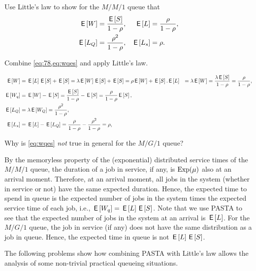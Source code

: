 \begin{exercise}
Use Little's law to show for the $M/M/1$ queue that 
  \begin{align*}
    \,\mathsf{E}\left[W\right] &= \frac{\,\mathsf{E}\left[S\right]}{1-\rho}, & \,\mathsf{E}\left[L\right] &= \frac\rho{1-\rho}, \\
    \,\mathsf{E}\left[L_Q\right] &= \frac{\rho^2}{1-\rho}, & \,\mathsf{E}\left[L_s\right] &= \rho.
  \end{align*}
\begin{hint}
  Combine \cref{eq:78,eq:wqes} and apply Little's law. 
\end{hint}
\begin{solution}
\begin{align*}
  \,\mathsf{E}\left[W\right] &= \,\mathsf{E}\left[L\right] \,\mathsf{E}\left[S\right] + \,\mathsf{E}\left[S\right] = \lambda \,\mathsf{E}\left[W\right] \,\mathsf{E}\left[S\right] + \,\mathsf{E}\left[S\right]= \rho \,\mathsf{E}\left[W\right] + \,\mathsf{E}\left[S\right]. 
    \,\mathsf{E}\left[L\right] &= \lambda \,\mathsf{E}\left[W\right] = \frac{\lambda \,\mathsf{E}\left[S\right]}{1-\rho} = \frac\rho{1-\rho}, \\
    \,\mathsf{E}\left[W_q\right] &= \,\mathsf{E}\left[W\right] - \,\mathsf{E}\left[S\right] = \frac{\,\mathsf{E}\left[S\right]}{1-\rho} - \,\mathsf{E}\left[S\right] = \frac{\rho}{1-\rho} \,\mathsf{E}\left[S\right],\\
  \,\mathsf{E}\left[L_Q\right] &= \lambda \,\mathsf{E}\left[W_Q\right] = \frac{\rho^2}{1-\rho}, \\
  \,\mathsf{E}\left[L_s\right] &= \,\mathsf{E}\left[L\right] - \,\mathsf{E}\left[L_Q\right] = \frac{\rho}{1-\rho} - \frac{\rho^2}{1-\rho} = \rho, 
\end{align*}
\end{solution}
\end{exercise}

\begin{exercise}
Why is \cref{eq:wqes} \emph{not} true in general for the $M/G/1$ queue? 
\begin{solution}
  By the memoryless property of the (exponential) distributed service times of the $M/M/1$ queue, the duration of a job in service, if any, is $\operatorname{Exp}(\mu)$ also at an arrival moment.
  Therefore, at an arrival moment, all jobs in the system (whether in service or not) have the same expected duration.
  Hence, the expected time to spend in queue is the expected number of jobs in the system times the expected service time of each job, i.e., $\,\mathsf{E}\left[W_q\right] = \,\mathsf{E}\left[L\right] \,\mathsf{E}\left[S\right]$.
  Note that we use PASTA to see that the expected number of jobs in the system at an arrival is $\,\mathsf{E}\left[L\right]$.
  For the $M/G/1$ queue, the job in service (if any) does not have the same distribution as a job in queue.
  Hence, the expected time in queue is not $\,\mathsf{E}\left[L\right] \,\mathsf{E}\left[S\right]$.
  \end{solution}
\end{exercise}


The following problems show how combining PASTA with Little's law allows the analysis of some non-trivial practical queueing situations.

